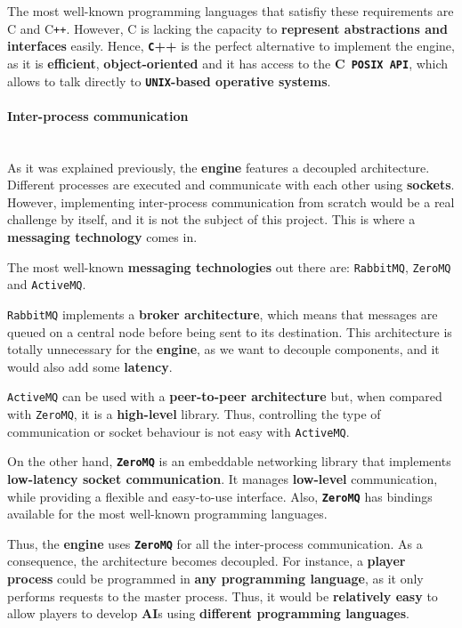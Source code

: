 \documentclass[a4paper,11pt]{article}
\begin{document}
The most well-known programming languages that satisfiy these requirements are \texttt{}C\texttt{} and \texttt{}C\texttt{++}. However, \texttt{}C\texttt{}  is lacking
the capacity to \textbf{represent abstractions and interfaces} easily. Hence, \textbf{\texttt{C}++} is the perfect alternative to implement
the engine, as it is \textbf{efficient}, \textbf{object-oriented} and it has access to the \textbf{\texttt{}C\texttt{ POSIX API}}, which allows to talk
directly to \textbf{\texttt{UNIX}-based operative systems}.
\paragraph{Inter-process communication}
\hfill
\\[0.2cm]
\indent
As it was explained previously, the \textbf{engine} features a decoupled architecture. Different processes are
executed and communicate with each other using \textbf{sockets}. However, implementing inter-process communication from
scratch would be a real challenge by itself, and it is not the subject of this project. This is where a
\textbf{messaging technology} comes in.

The most well-known \textbf{messaging technologies} out there are: \texttt{RabbitMQ}, \texttt{ZeroMQ} and \texttt{ActiveMQ}.

\texttt{RabbitMQ} implements
a \textbf{broker architecture}, which means that messages are queued on a central node before being sent to its destination.
This architecture is totally unnecessary for the \textbf{engine}, as we want to decouple components, and it would also add
some \textbf{latency}.

\texttt{ActiveMQ} can be used with a \textbf{peer-to-peer architecture} but, when compared with \texttt{ZeroMQ}, it is a
\textbf{high-level} library. Thus, controlling the type of communication or socket behaviour is not easy with \texttt{ActiveMQ}.

On the other hand, \textbf{\texttt{ZeroMQ}} \cite{zeromq} is an embeddable networking library that implements \textbf{low-latency socket communication}. It manages
\textbf{low-level} communication, while providing a flexible and easy-to-use interface. Also, \textbf{\texttt{ZeroMQ}} has bindings available
for the most well-known programming languages.

Thus, the \textbf{engine} uses \textbf{\texttt{ZeroMQ}} for all the inter-process communication. As a consequence, the architecture becomes
decoupled. For instance, a \textbf{player process} could be programmed in \textbf{any programming language}, as it
only performs requests to the master process. Thus, it would be \textbf{relatively easy} to allow players to develop
\textbf{AI}s using \textbf{different programming languages}.
\end{document}
